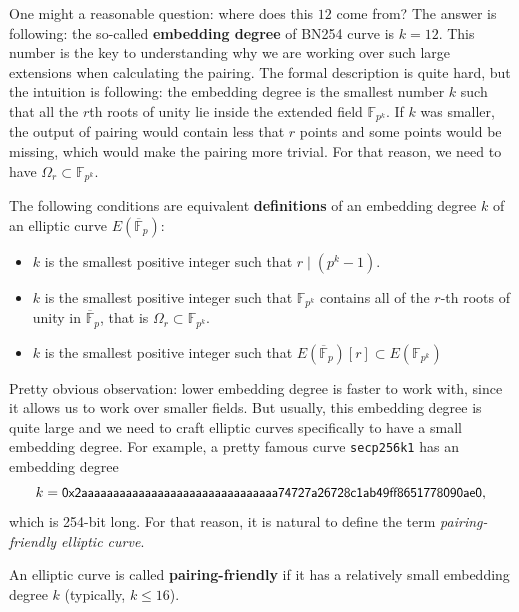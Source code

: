 \documentclass[../lecture-notes-148x210.tex]{subfiles}
\begin{document}
\begin{remark}
    One might a reasonable question: where does this $12$ come from? The answer is following: the so-called \textbf{embedding degree} of BN254 curve is $k=12$. This number is the key to understanding why we are working over such large extensions when calculating the pairing. The formal description is quite hard, but the intuition is following: the embedding degree is the smallest number $k$ such that all the $r$th roots of unity lie inside the extended field $\mathbb{F}_{p^k}$. If $k$ was smaller, the output of pairing would contain less that $r$ points and some points would be missing, which would make the pairing more trivial. For that reason, we need to have $\Omega_r \subset \mathbb{F}_{p^k}$.
\end{remark}

\begin{definition}
    The following conditions are equivalent \textbf{definitions} of an embedding degree $k$ of an elliptic curve $E(\overline{\mathbb{F}}_p)$:
    \begin{itemize}
        \item $k$ is the smallest positive integer such that $r \mid (p^k-1)$.
        \item $k$ is the smallest positive integer such that $\mathbb{F}_{p^k}$ contains all of the $r$-th roots of unity in $\overline{\mathbb{F}}_p$, that is $\Omega_r \subset \mathbb{F}_{p^k}$.
        \item $k$ is the smallest positive integer such that $E(\overline{\mathbb{F}}_p)[r] \subset E(\mathbb{F}_{p^k})$
    \end{itemize}
\end{definition}

Pretty obvious observation: lower embedding degree is faster to work with, since it allows us to work over smaller fields. But usually, this embedding degree is quite large and we need to craft elliptic curves specifically to have a small embedding degree. For example, a pretty famous curve \texttt{secp256k1} has an embedding degree
\begin{equation*}
    k = \scalebox{0.95}{$\mathsf{0x2aaaaaaaaaaaaaaaaaaaaaaaaaaaaaaa74727a26728c1ab49ff8651778090ae0}$},
\end{equation*}
which is 254-bit long. For that reason, it is natural to define the term \textit{pairing-friendly elliptic curve}.
\begin{definition}
    An elliptic curve is called \textbf{pairing-friendly} if it has a relatively small embedding degree $k$ (typically, $k \leq 16$).
\end{definition}
\end{document}
